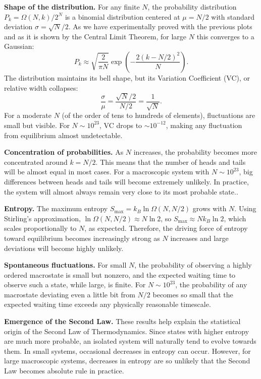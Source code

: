 \documentclass[11pt, a4paper]{article}
\begin{document}
\textbf{Shape of the distribution.}
For any finite $N$, the probability distribution $P_k = \Omega(N,k)/2^N$ is a binomial distribution
centered at $\mu = N/2$ with standard deviation $\sigma = \sqrt{N}/2$. As we have experimentally proved with the previous plots and as it is shown by the Central Limit Theorem,
for large $N$ this converges to a Gaussian:
\begin{equation}
P_k \approx \sqrt{\frac{2}{\pi N}} \exp\!\left(-\frac{2(k - N/2)^2}{N}\right).
\end{equation}
The distribution maintains its bell shape, but its Variation Coefficient (VC), or relative width collapses:
\begin{equation}
\frac{\sigma}{\mu} = \frac{\sqrt{N}/2}{N/2} = \frac{1}{\sqrt{N}}.
\end{equation}
For a moderate $N$ (of the order of tens to hundreds of elements), fluctuations are small but visible. For $N \sim 10^{23}$, 
VC drops to $\sim 10^{-12}$, making any fluctuation from equilibrium almost
undetectable.

\textbf{Concentration of probabilities.}
As $N$ increases, the probability becomes more concentrated around $k = N/2.$ This means that the number of heads and tails will be almost equal in most cases. For a macroscopic system with $N \sim 10^{23}$, big differences between heads and tails will become extremely unlikely. In practice, the system will almost always remain very close to its most probable state..

\textbf{Entropy.}
The maximum entropy $S_{\max} = k_B \ln \Omega(N, N/2)$ grows with $N$. Using Stirling's approximation,
$\ln \Omega(N, N/2) \approx N \ln 2$, so $S_{\max} \approx N k_B \ln 2$, which scales proportionally to $N$, as expected. Therefore, the driving force of entropy toward
equilibrium  becomes increasingly strong as $N$ increases and large deviations will become highly unlikely.

\textbf{Spontaneous fluctuations.}
For small $N$, the probability of observing a highly ordered macrostate is small but nonzero, and the
expected waiting time to observe such a state, while large, is finite. For
$N \sim 10^{23}$, the probability of any macrostate deviating even a little bit from $N/2$ becomes so
small that the expected waiting time  exceeds any physically reasonable timescale. 

\textbf{Emergence of the Second Law.}
These results help explain the statistical origin of the Second Law of Thermodynamics. Since states with higher entropy are much more probable, an isolated system will naturally tend to evolve towards them. In small systems, occasional decreases in entropy can occur. However, for large macroscopic systems, decreases in entropy are so unlikely that the Second Law becomes absolute rule in practice.
\end{document}

